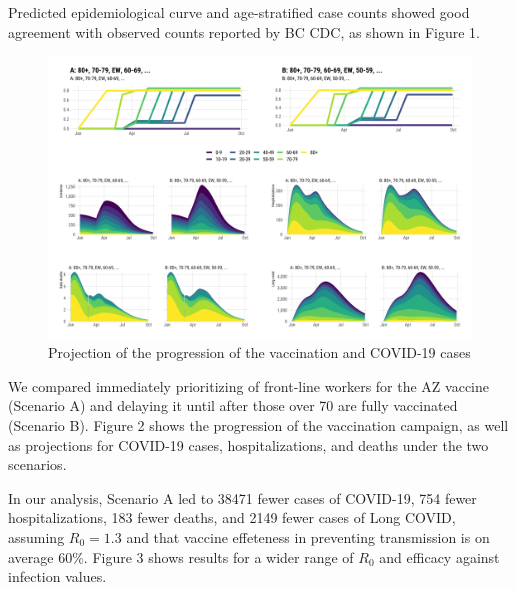 \documentclass[]{interact}
\theoremstyle{plain}%
\theoremstyle{definition}
\theoremstyle{remark}
\begin{document}
Predicted epidemiological curve and age-stratified case counts showed
good agreement with observed counts reported by BC CDC, as shown in
Figure 1.

\begin{figure}

{\centering \includegraphics[width=1\linewidth]{../figures/fig-trajectoriesFull} 

}

\caption{Projection of the progression of the vaccination and COVID-19 cases}\label{fig:fig1}
\end{figure}

We compared immediately prioritizing of front-line workers for the AZ
vaccine (Scenario A) and delaying it until after those over 70 are fully
vaccinated (Scenario B). Figure 2 shows the progression of the
vaccination campaign, as well as projections for COVID-19 cases,
hospitalizations, and deaths under the two scenarios.

In our analysis, Scenario A led to 38471 fewer cases of COVID-19, 754
fewer hospitalizations, 183 fewer deaths, and 2149 fewer cases of Long
COVID, assuming \(R_0=1.3\) and that vaccine effeteness in preventing
transmission is on average 60\%. Figure 3 shows results for a wider
range of \(R_0\) and efficacy against infection values.
\end{document}
